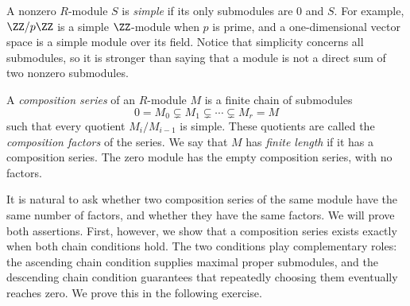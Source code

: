 \documentclass[12pt,reqno]{amsart}
\begin{document}
\hrulefill

A nonzero $R$-module $S$ is \emph{simple} if its only submodules are $0$ and $S$. For example, $\ZZ/p\ZZ$ is a simple $\ZZ$-module when $p$ is prime, and a one-dimensional vector space is a simple module over its field. Notice that simplicity concerns all submodules, so it is stronger than saying that a module is not a direct sum of two nonzero submodules.

A \emph{composition series} of an $R$-module $M$ is a finite chain of submodules
\[
0=M_0\subsetneq M_1\subsetneq\cdots\subsetneq M_r=M
\]
such that every quotient $M_i/M_{i-1}$ is simple. These quotients are called the \emph{composition factors} of the series. We say that $M$ has \emph{finite length} if it has a composition series. The zero module has the empty composition series, with no factors.

It is natural to ask whether two composition series of the same module have the same number of factors, and whether they have the same factors. We will prove both assertions. First, however, we show that a composition series exists exactly when both chain conditions hold. The two conditions play complementary roles: the ascending chain condition supplies maximal proper submodules, and the descending chain condition guarantees that repeatedly choosing them eventually reaches zero. We prove this in the following exercise.

\hrulefill
\end{document}
